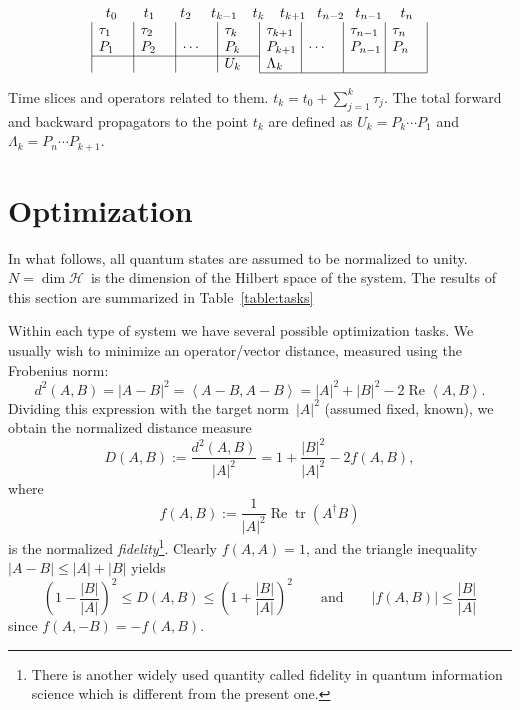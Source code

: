 \documentclass[aps, pra, a4paper, longbibliography]{revtex4}
\newcommand{\be}{\begin{equation}}
\newcommand{\ee}{\end{equation}}
\newcommand{\inprod}[2]{\left\langle #1, #2 \right\rangle}
\newcommand{\hilb}[1]{\mathcal{#1}}
\DeclareMathOperator{\tr}{tr}
\DeclareMathOperator{\re}{Re}
\begin{document}
\begin{table}[h]
\[
\begin{array}{c}
\begin{array}{@{t_0}p{1.9em}@{t_1}p{1.8em}@{t_2}p{1.4em}@{t_{k-1}}p{1.1em}@{t_{k}}p{1.1em}@{t_{k+1}}p{0.8em}@{t_{n-2}}p{0.8em}@{t_{n-1}}p{1.3em}@{t_n}}
& & & & & & &
\end{array}\\
\begin{array}{|p{2em}|p{2em}|p{2em}|p{2em}|p{2em}|p{2em}|p{2em}|p{2em}|}
 $\tau_1$ & $\tau_2$ & & $\tau_k$ & $\tau_{k+1}$ & & $\tau_{n-1}$ & $\tau_n$ \\
 $P_1$ & $P_2$ & $\cdots$ & $P_k$ & $P_{k+1}$ & $\cdots$ & $P_{n-1}$ & $P_n$ \\
\cline{1-4}
& & & $U_{k}$ & $\Lambda_{k}$ & & & \\
\cline{5-8}
\end{array}
\end{array}
\]
\caption{Time slices and operators related to them.
$t_k = t_0 + \sum_{j=1}^{k} \tau_j$.
The total forward and backward
propagators to the point $t_k$ are defined as
$U_k = P_k \cdots P_1$ and
$\Lambda_k = P_{n} \cdots P_{k+1}$.}
\end{table}








\section{Optimization}

In what follows, all quantum states are assumed to be normalized to
unity. $N = \dim \hilb{H}$~is the dimension of the Hilbert space of the system.
The results of this section are summarized in Table~\ref{table:tasks}


Within each type of system we have several possible optimization
tasks.
We usually wish to minimize an operator/vector distance, measured using the Frobenius norm:
\be
d^2(A, B) = |A-B|^2
= \inprod{A-B}{A-B}
= |A|^2 +|B|^2 -2 \re \inprod{A}{B}.
\ee
Dividing this expression with the target norm~$|A|^2$ (assumed fixed,
known), we obtain the normalized distance measure
\be
\label{eq:df}
D(A,B)
:= \frac{d^2(A, B)}{|A|^2}
= 1 +\frac{|B|^2}{|A|^2} -2 f(A, B),
\ee
where
\be
f(A, B) := \frac{1}{|A|^2} \re \tr(A^\dagger B)
\ee
is the normalized \emph{fidelity}\footnote{
There is another widely used quantity called fidelity in quantum information science which is different from the present one.}.
Clearly $f(A, A) = 1$, and
the triangle inequality $|A-B| \le |A|+|B|$ yields
\be
\left(1 -\frac{|B|}{|A|} \right)^2 \le D(A, B) \le \left(1 +\frac{|B|}{|A|} \right)^2
\qquad \text{and} \qquad
|f(A, B)|
\le \frac{|B|}{|A|}
\ee
since $f(A, -B) = -f(A, B)$.
\end{document}
